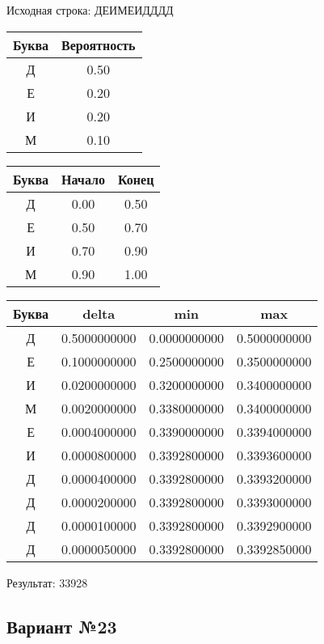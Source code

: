 \documentclass[a4paper, 12pt]{article}
\begin{document}
Исходная строка: ДЕИМЕИДДДД\
\begin{center}
 \begin{tabular}{ |c|c| } 
  \hline
     Буква & Вероятность \\ \hline
Д & 0.50\\\hline
Е & 0.20\\\hline
И & 0.20\\\hline
М & 0.10
\\ \hline \end{tabular}
\end{center}
\begin{center}
 \begin{tabular}{ |c|c|c| } 
  \hline
     Буква & Начало & Конец \\ \hline
Д & 0.00 & 0.50\\\hline
Е & 0.50 & 0.70\\\hline
И & 0.70 & 0.90\\\hline
М & 0.90 & 1.00
\\ \hline \end{tabular}
\end{center}
\begin{center}
 \begin{tabular}{ |c|c|c|c| } 
  \hline
     Буква & delta & min & max \\ \hline
Д & 0.5000000000 & 0.0000000000 & 0.5000000000\\\hline
Е & 0.1000000000 & 0.2500000000 & 0.3500000000\\\hline
И & 0.0200000000 & 0.3200000000 & 0.3400000000\\\hline
М & 0.0020000000 & 0.3380000000 & 0.3400000000\\\hline
Е & 0.0004000000 & 0.3390000000 & 0.3394000000\\\hline
И & 0.0000800000 & 0.3392800000 & 0.3393600000\\\hline
Д & 0.0000400000 & 0.3392800000 & 0.3393200000\\\hline
Д & 0.0000200000 & 0.3392800000 & 0.3393000000\\\hline
Д & 0.0000100000 & 0.3392800000 & 0.3392900000\\\hline
Д & 0.0000050000 & 0.3392800000 & 0.3392850000
\\ \hline \end{tabular}
\end{center}
Результат: 33928
\pagebreak
\subsection{Вариант №23}
\end{document}
